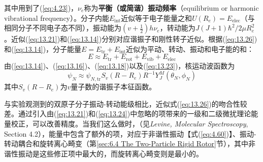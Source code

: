     其中用到了(\ref{eq:4.23})，$\nu_e$称为\textbf{平衡（或简谐）振动频率}（equilibrium or harmonic vibrational frequency）。分子内能$E_{\text{int}}$近似等于电子能量之和$U\left(R_e\right) = E_{\text{elec}}$（与相同分子不同电子态不同），振动能为$\left(v + \frac{1}{2}\right)h\nu_e$，转动能为$J\left(J+1\right)\hbar^2/2\mu R_e^2$。近似(\ref{eq:13.21})和(\ref{eq:13.14})分别对应谐振子和刚性转子近似。根据(\ref{eq:13.26})和(\ref{eq:13.14})，分子能量$E = E_{\text{tr}} + E_{\text{int}}$近似为平动、转动、振动和电子能的和：
    \begin{equation*}
        E \approx E_{\text{tr}} + E_{\text{rot}} + E_{\text{vib}} + E_{\text{elec}}
    \end{equation*}
    由(\ref{eq:13.14})、(\ref{eq:13.16})、(\ref{eq:13.18})以及(\ref{eq:13.23})，核运动波函数为
    \begin{equation}
        \psi_N \approx \psi_{N,\text{tr}} S_v \left(R - R_e\right)R^{-1}Y_J^M\left(\theta_N,\phi_N\right)
        \label{eq:13.28}
    \end{equation}
    其中$S_v\left(R - R_e\right)$为$v$量子数的谐振子本征函数。

    与实验观测到的双原子分子振动-转动能级相比，近似式(\ref{eq:13.26})的吻合性较差。通过引入由(\ref{eq:13.21})和(\ref{eq:13.24})中忽略的项带来的一级和二级微扰理论能量校正，可以改善精度。当我们这么做时，（见\textit{Levine, Molecular Spectroscopy}, Section 4.2），能量中包含了额外的项，对应于非谐性振动【式(\ref{eq:4.60})】、振动-转动耦合和旋转离心畸变（第\ref{sec:6.4 The Two-Particle Rigid Rotor}节），其中非谐性振动是这些修正项中最大的，而旋转离心畸变则是最小的。


